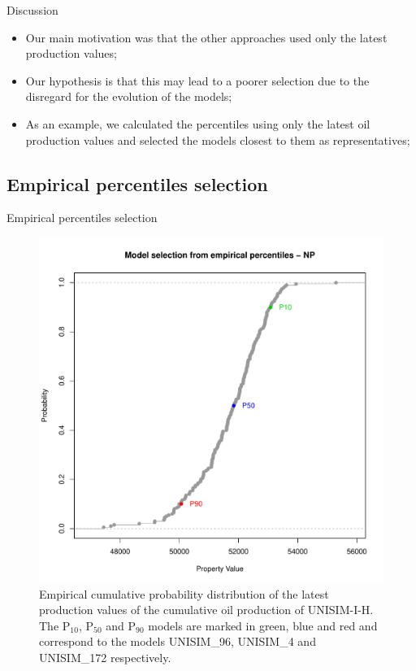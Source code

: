 \documentclass{beamer}
\begin{document}
\begin{frame}{Discussion}
  \begin{itemize}
    \item Our main motivation was that the other approaches used only the latest production values;
    \item Our hypothesis is that this may lead to a poorer selection due to the disregard for the evolution of the models;
    \item As an example, we calculated the percentiles using only the latest oil production values and selected the models closest to them as representatives;
  \end{itemize}
\end{frame}

\subsection{Empirical percentiles selection}
\begin{frame}{Empirical percentiles selection}
  \begin{figure}[H]
    \centering
    \includegraphics[width=0.48\columnwidth]{ecdf-NP.pdf}
    \caption{Empirical cumulative probability distribution of the latest production values of the cumulative oil production of UNISIM-I-H. The P$_{10}$, P$_{50}$ and P$_{90}$ models are marked in green, blue and red and correspond to the models UNISIM\_96, UNISIM\_4 and UNISIM\_172 respectively.}
    \label{fig:ecdf-NP}
  \end{figure}
\end{frame}
\end{document}
